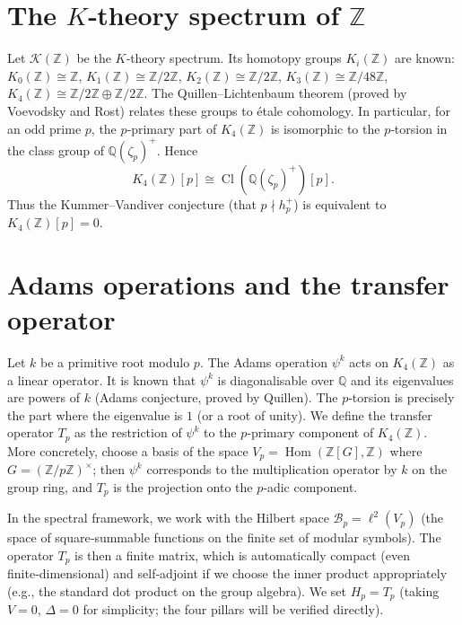 \documentclass[11pt,a4paper]{article}
\begin{document}
\section{The $K$‑theory spectrum of $\mathbb{Z}$}

Let $\mathcal{K}(\mathbb{Z})$ be the $K$‑theory spectrum. Its homotopy groups $K_i(\mathbb{Z})$ are known: $K_0(\mathbb{Z}) \cong \mathbb{Z}$, $K_1(\mathbb{Z}) \cong \mathbb{Z}/2\mathbb{Z}$, $K_2(\mathbb{Z}) \cong \mathbb{Z}/2\mathbb{Z}$, $K_3(\mathbb{Z}) \cong \mathbb{Z}/48\mathbb{Z}$, $K_4(\mathbb{Z}) \cong \mathbb{Z}/2\mathbb{Z} \oplus \mathbb{Z}/2\mathbb{Z}$. The Quillen–Lichtenbaum theorem (proved by Voevodsky and Rost) relates these groups to étale cohomology. In particular, for an odd prime $p$, the $p$‑primary part of $K_4(\mathbb{Z})$ is isomorphic to the $p$‑torsion in the class group of $\mathbb{Q}(\zeta_p)^+$. Hence
\[
K_4(\mathbb{Z})[p] \cong \operatorname{Cl}(\mathbb{Q}(\zeta_p)^+)[p].
\]
Thus the Kummer–Vandiver conjecture (that $p \nmid h_p^+$) is equivalent to $K_4(\mathbb{Z})[p] = 0$.

\section{Adams operations and the transfer operator}

Let $k$ be a primitive root modulo $p$. The Adams operation $\psi^k$ acts on $K_4(\mathbb{Z})$ as a linear operator. It is known that $\psi^k$ is diagonalisable over $\mathbb{Q}$ and its eigenvalues are powers of $k$ (Adams conjecture, proved by Quillen). The $p$‑torsion is precisely the part where the eigenvalue is $1$ (or a root of unity). We define the transfer operator $T_p$ as the restriction of $\psi^k$ to the $p$‑primary component of $K_4(\mathbb{Z})$. More concretely, choose a basis of the space $V_p = \operatorname{Hom}(\mathbb{Z}[G], \mathbb{Z})$ where $G = (\mathbb{Z}/p\mathbb{Z})^\times$; then $\psi^k$ corresponds to the multiplication operator by $k$ on the group ring, and $T_p$ is the projection onto the $p$‑adic component.

In the spectral framework, we work with the Hilbert space $\mathcal{B}_p = \ell^2(V_p)$ (the space of square‑summable functions on the finite set of modular symbols). The operator $T_p$ is then a finite matrix, which is automatically compact (even finite‑dimensional) and self‑adjoint if we choose the inner product appropriately (e.g., the standard dot product on the group algebra). We set $H_p = T_p$ (taking $V=0$, $\Delta = 0$ for simplicity; the four pillars will be verified directly).
\end{document}
